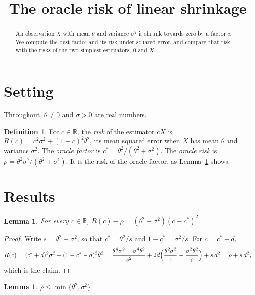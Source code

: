 \documentclass[11pt]{article}
\title{The oracle risk of linear shrinkage}
\author{}
\date{}
\newtheorem{lemma}[theorem]{Lemma}
\theoremstyle{definition}
\newtheorem{definition}[theorem]{Definition}
\begin{document}
\maketitle

\begin{abstract}
An observation $X$ with mean $\theta$ and variance $\sigma^2$ is shrunk towards zero by a factor $c$. We compute the
best factor and its risk under squared error, and compare that risk with the risks of the two simplest
estimators, $0$ and $X$.
\end{abstract}

\section{Setting}

Throughout, $\theta \ne 0$ and $\sigma > 0$ are real numbers.

\begin{definition}\label{def:risk}
For $c \in \mathbb{R}$, the \emph{risk} of the estimator $cX$ is
$R(c) = c^2 \sigma^2 + (1-c)^2 \theta^2$, its mean squared error when $X$ has mean $\theta$ and variance $\sigma^2$.
The \emph{oracle factor} is
$c^\ast = \theta^2 / (\theta^2 + \sigma^2)$.
The \emph{oracle risk} is
$\rho = \theta^2 \sigma^2 / (\theta^2 + \sigma^2)$.
It is the risk of the oracle factor, as Lemma~\ref{lem:square} shows.
\end{definition}

\section{Results}

\begin{lemma}\label{lem:square}
For every $c \in \mathbb{R}$, $R(c) - \rho = (\theta^2 + \sigma^2)(c - c^\ast)^2$.
\end{lemma}

\begin{proof}
Write $s = \theta^2 + \sigma^2$, so that $c^\ast = \theta^2 / s$ and $1 - c^\ast = \sigma^2 / s$. For
$c = c^\ast + d$,
\[
  R(c) = (c^\ast + d)^2 \sigma^2 + (1 - c^\ast - d)^2 \theta^2
       = \frac{\theta^4 \sigma^2 + \sigma^4 \theta^2}{s^2} + 2d\Bigl(\frac{\theta^2\sigma^2}{s} - \frac{\sigma^2\theta^2}{s}\Bigr) + s\, d^2
       = \rho + s\, d^2 ,
\]
which is the claim.
\end{proof}

\begin{lemma}\label{lem:min}
$\rho \le \min\{\theta^2, \sigma^2\}$.
\end{lemma}
\end{document}

